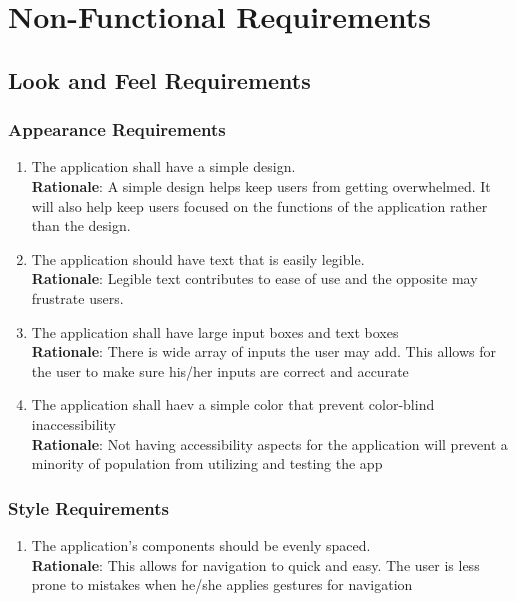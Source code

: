 \section{Non-Functional Requirements}
\label{sec:non-functional_requirements}


\subsection{Look and Feel Requirements}
\label{sub:look_and_feel_requirements}


\subsubsection{Appearance Requirements}
\label{ssub:appearance_requirements}
\begin{enumerate}[{LF-A}1. ]
	\item The application shall have a simple design.
	\\ \textbf{Rationale}: A simple design helps keep users from getting overwhelmed. It will also help keep users focused on the 
	functions of the application rather than the design.
	\item The application should have text that is easily legible.
	\\ \textbf{Rationale}: Legible text contributes to ease of use and the opposite may frustrate users.
	\item The application shall have large input boxes and text boxes
	\\ \textbf{Rationale}: There is wide array of inputs the user may add. This allows for the user to make sure his/her inputs are correct and accurate
	\item The application shall haev a simple color that prevent color-blind inaccessibility
	\\ \textbf{Rationale}: Not having accessibility aspects for the application will prevent a minority of population from utilizing and testing the app  
\end{enumerate}


\subsubsection{Style Requirements}
\label{ssub:style_requirements}
\begin{enumerate}[{LF-S}1. ]
	\item The application’s components should be evenly spaced.
	\\ \textbf{Rationale}: This allows for navigation to quick and easy. The user is less prone to mistakes when he/she applies gestures for navigation
\end{enumerate}

